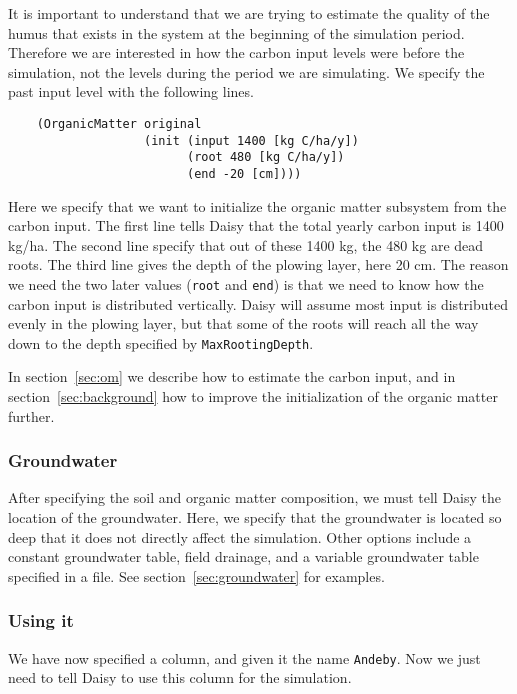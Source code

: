 \documentclass[a4paper]{article}
\begin{document}
It is important to understand that we are trying to estimate the
quality of the humus that exists in the system at the beginning of the
simulation period.  Therefore we are interested in how the carbon
input levels were before the simulation, not the levels during the
period we are simulating.  We specify the past input level with the
following lines.

\begin{verbatim}
    (OrganicMatter original
                   (init (input 1400 [kg C/ha/y])
                         (root 480 [kg C/ha/y])
                         (end -20 [cm])))
\end{verbatim}

Here we specify that we want to initialize the organic matter
subsystem from the carbon input.  The first line tells Daisy that the
total yearly carbon input is 1400 kg/ha.  The second line specify that
out of these 1400 kg, the 480 kg are dead roots.  The third line gives
the depth of the plowing layer, here 20 cm.  The reason we need the
two later values (\texttt{root} and \texttt{end}) is that we need to
know how the carbon input is distributed vertically.  Daisy will
assume most input is distributed evenly in the plowing layer, but that
some of the roots will reach all the way down to the depth specified
by \texttt{MaxRootingDepth}.

In section~\ref{sec:om} we describe how to estimate the carbon input,
and in section~\ref{sec:background} how to improve the initialization
of the organic matter further.

\subsubsection{Groundwater}
\label{ex:groundwater}

After specifying the soil and organic matter composition, we must tell
Daisy the location of the groundwater.  Here, we specify that the
groundwater is located so deep that it does not directly affect the
simulation.  Other options include a constant groundwater table, field
drainage, and a variable groundwater table specified in a file.  See
section~\ref{sec:groundwater} for examples.  

\subsubsection{Using it}

We have now specified a column, and given it the name \texttt{Andeby}.
Now we just need to tell Daisy to use this column for the
simulation.
\end{document}

